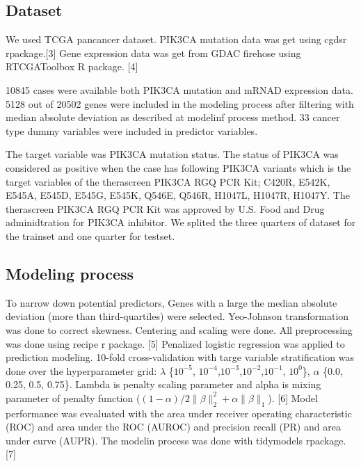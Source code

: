 \documentclass[10pt,letterpaper]{article}
\begin{document}
\hypertarget{dataset}{%
\subsection{Dataset}\label{dataset}}

We used TCGA pancancer dataset. PIK3CA mutation data was get using cgdsr
rpackage.{[}3{]} Gene expression data was get from GDAC firehose using
RTCGAToolbox R package. {[}4{]}

10845 cases were available both PIK3CA mutation and mRNAD expression
data. 5128 out of 20502 genes were included in the modeling process
after filtering with median absolute deviation as described at modelinf
process method. 33 cancer type dummy variables were included in
predictor variables.

The target variable was PIK3CA mutation status. The status of PIK3CA was
considered as positive when the case has following PIK3CA variants which
is the target variables of the therascreen PIK3CA RGQ PCR Kit; C420R,
E542K, E545A, E545D, E545G, E545K, Q546E, Q546R, H1047L, H1047R, H1047Y.
The therascreen PIK3CA RGQ PCR Kit was approved by U.S. Food and Drug
adminidtration for PIK3CA inhibitor. We splited the three quarters of
dataset for the trainset and one quarter for testset.

\hypertarget{modeling-process}{%
\subsection{Modeling process}\label{modeling-process}}

To narrow down potential predictors, Genes with a large the median
absolute deviation (more than third-quartiles) were selected.
Yeo-Johnson transformation was done to correct skewness. Centering and
scaling were done. All preprocessing was done using recipe r package.
{[}5{]} Penalized logistic regression was applied to prediction
modeling. 10-fold cross-validation with targe variable stratification
was done over the hyperparameter grid: \(\lambda\) \{\(10^{-5}\),
\(10^{-4}\),\(10^{-3}\),\(10^{-2}\),\(10^{-1}\), \(10^{0}\)\},
\(\alpha\) \{0.0, 0.25, 0.5, 0.75\}. Lambda is penalty scaling parameter
and alpha is mixing parameter of penalty function
(\((1-\alpha)/2 \lVert\beta\rVert_2^2+\alpha\lVert \beta \rVert_1\)).
{[}6{]} Model performance was evealuated with the area under receiver
operating characteristic (ROC) and area under the ROC (AUROC) and
precision recall (PR) and area under curve (AUPR). The modelin process
was done with tidymodels rpackage. {[}7{]}
\end{document}
